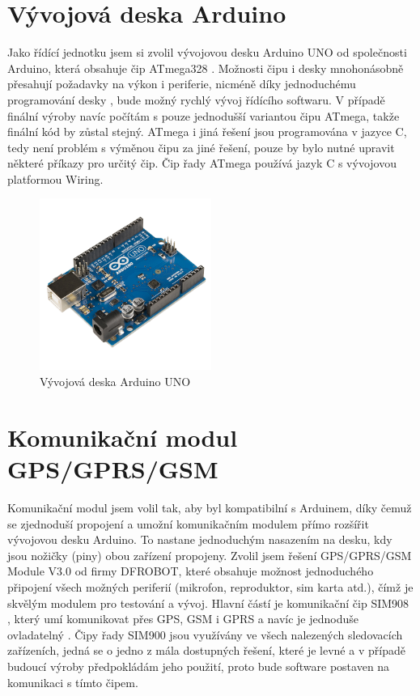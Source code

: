 \documentclass[FM,MP]{tulthesis}  %
\begin{document}
\section{Vývojová deska Arduino}
Jako řídící jednotku jsem si zvolil vývojovou desku Arduino UNO \cite{Arduino schematic} od společnosti Arduino, která obsahuje čip ATmega328 \cite{Atmega datasheet}. Možnosti čipu i desky mnohonásobně přesahují požadavky na výkon i periferie, nicméně díky jednoduchému programování desky \cite{Pruvodce arduinem}, bude možný rychlý vývoj řídícího softwaru. V případě finální výroby navíc počítám s pouze jednodušší variantou čipu ATmega, takže finální kód by zůstal stejný. ATmega i jiná řešení jsou programována v jazyce C, tedy není problém s výměnou čipu za jiné řešení, pouze by bylo nutné upravit některé příkazy pro určitý čip. Čip řady ATmega používá jazyk C s vývojovou platformou Wiring.

\begin{figure}[H]
\begin{center}
\includegraphics[width=0.5\textwidth]{images/arduino.png}
\caption{Vývojová deska Arduino UNO}
\label{image}
\end{center}
\end{figure}

\section{Komunikační modul GPS/GPRS/GSM}
Komunikační modul jsem volil tak, aby byl kompatibilní s Arduinem, díky čemuž se zjednoduší propojení a umožní komunikačním modulem přímo rozšířit vývojovou desku Arduino. To nastane jednoduchým nasazením na desku, kdy jsou nožičky (piny) obou zařízení propojeny. Zvolil jsem řešení GPS/GPRS/GSM Module V3.0 \cite{ROBOT schematic} od firmy DFROBOT, které obsahuje možnost jednoduchého připojení všech možných periferií (mikrofon, reproduktor, sim karta atd.), čímž je skvělým modulem pro testování a vývoj. Hlavní částí je komunikační čip SIM908 \cite{SIMCOM HW}, který umí komunikovat přes GPS, GSM i GPRS a navíc je jednoduše ovladatelný \cite{SIMCOM SW}. Čipy řady SIM900 jsou využívány ve všech nalezených sledovacích zařízeních, jedná se o jedno z mála dostupných řešení, které je levné a v případě budoucí výroby předpokládám jeho použití, proto bude software postaven na komunikaci s tímto čipem.
\end{document}
